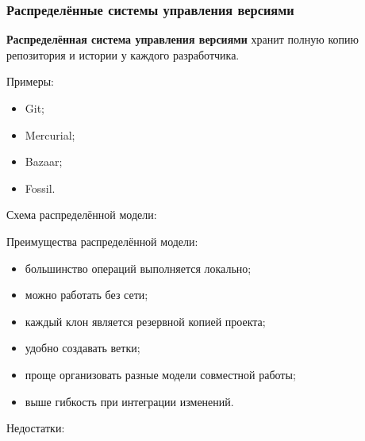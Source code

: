 \documentclass[12pt,a4paper]{article}
\begin{document}
\subsubsection{Распределённые системы управления версиями}

\textbf{Распределённая система управления версиями} хранит полную копию репозитория и истории у каждого разработчика.

Примеры:

\begin{itemize}
    \item Git;
    \item Mercurial;
    \item Bazaar;
    \item Fossil.
\end{itemize}

Схема распределённой модели:

\begin{center}
\end{center}

Преимущества распределённой модели:

\begin{itemize}
    \item большинство операций выполняется локально;
    \item можно работать без сети;
    \item каждый клон является резервной копией проекта;
    \item удобно создавать ветки;
    \item проще организовать разные модели совместной работы;
    \item выше гибкость при интеграции изменений.
\end{itemize}

Недостатки:
\end{document}
